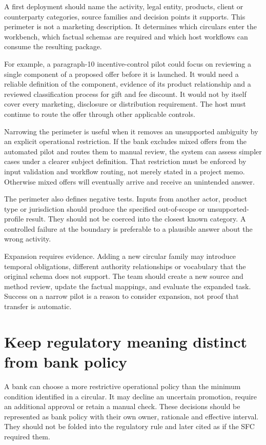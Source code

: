 A first deployment should name the activity, legal entity, products, client or
counterparty categories, source families and decision points it supports. This
perimeter is not a marketing description. It determines which circulars enter the
workbench, which factual schemas are required and which host workflows can consume
the resulting package.

For example, a paragraph-10 incentive-control pilot could focus on reviewing a
single component of a proposed offer before it is launched. It would need a
reliable definition of the component, evidence of its product relationship and a
reviewed classification process for gift and fee discount. It would not by itself
cover every marketing, disclosure or distribution requirement. The host must
continue to route the offer through other applicable controls.

Narrowing the perimeter is useful when it removes an unsupported ambiguity by an
explicit operational restriction. If the bank excludes mixed offers from the
automated pilot and routes them to manual review, the system can assess simpler
cases under a clearer subject definition. That restriction must be enforced by
input validation and workflow routing, not merely stated in a project memo.
Otherwise mixed offers will eventually arrive and receive an unintended answer.

The perimeter also defines negative tests. Inputs from another actor, product type
or jurisdiction should produce the specified out-of-scope or unsupported-profile
result. They should not be coerced into the closest known category. A controlled
failure at the boundary is preferable to a plausible answer about the wrong
activity.

Expansion requires evidence. Adding a new circular family may introduce temporal
obligations, different authority relationships or vocabulary that the original
schema does not support. The team should create a new source and method review,
update the factual mappings, and evaluate the expanded task. Success on a narrow
pilot is a reason to consider expansion, not proof that transfer is automatic.

\section{Keep regulatory meaning distinct from bank policy}

A bank can choose a more restrictive operational policy than the minimum condition
identified in a circular. It may decline an uncertain promotion, require an
additional approval or retain a manual check. These decisions should be represented
as bank policy with their own owner, rationale and effective interval. They should
not be folded into the regulatory rule and later cited as if the SFC required them.


